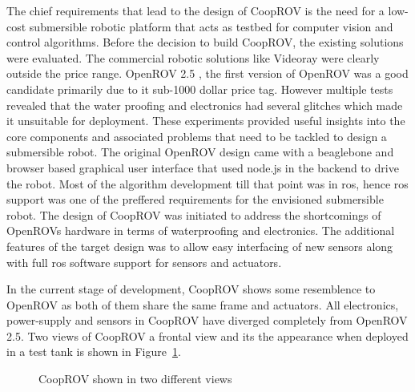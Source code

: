 \documentclass {udthesis}
\begin{document}
The chief requirements that lead to the design of CoopROV is the need for a low-cost submersible robotic platform that acts as testbed for computer vision and control algorithms. Before the decision to build CoopROV, the existing solutions were evaluated. The commercial robotic solutions like Videoray were clearly outside the price range. OpenROV 2.5 \cite{openrov}, the first version of OpenROV was a good candidate primarily due to it sub-1000 dollar price tag. However multiple tests revealed that the water proofing and electronics had several glitches which made it unsuitable for deployment. These experiments provided useful insights into the core components and associated problems that need to be tackled to design a submersible robot. The original OpenROV design came with a beaglebone and browser based graphical user interface that used node.js \cite{nodejs} in the backend to drive the robot. Most of the algorithm development till that point was in \gls{ros}, hence \gls{ros} support was one of the preffered requirements for the envisioned submersible robot. The design of CoopROV was initiated to address the shortcomings of OpenROVs hardware in terms of waterproofing and electronics. The additional features of the target design was to allow easy interfacing of new sensors along with full \gls{ros} software support for sensors and actuators.

In the current stage of development, CoopROV shows some resemblence to OpenROV as both of them share the same frame and actuators. All electronics, power-supply and sensors in CoopROV have diverged completely from OpenROV 2.5. Two views of CoopROV a frontal view and its the appearance when deployed in a test tank is shown in Figure~\ref{fig:cooprov}.
%
\begin{figure} \label{fig:cooprov}
\centering
{}
\caption{CoopROV shown in two different views}
\end{figure} 
\end{document}
